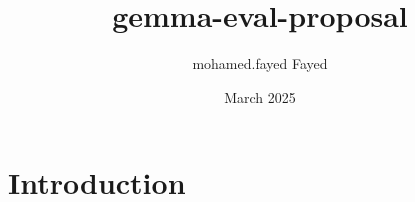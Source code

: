 \documentclass{article}
\title{gemma-eval-proposal}
\author{mohamed.fayed Fayed}
\date{March 2025}
\begin{document}
\maketitle

\section{Introduction}
\end{document}

